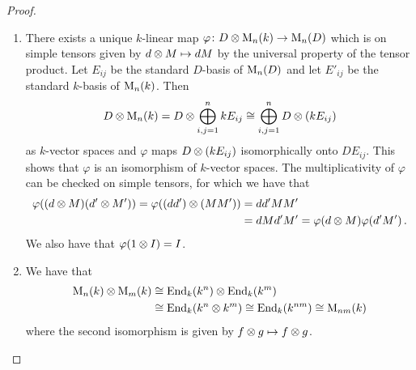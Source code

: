 \begin{proof}
  \leavevmode
  \begin{enumerate}
    \item
      There exists a unique $k$-linear map $\varphi \colon D \mathbin{\otimes} \operatorname{M}_n(k) \to \operatorname{M}_n(D)$ which is on simple tensors given by $d \mathbin{\otimes} M \mapsto dM$ by the universal property of the tensor product.
      Let $E_{ij}$ be the standard $D$-basis of $\operatorname{M}_n(D)$ and let $E'_{ij}$ be the standard $k$-basis of $\operatorname{M}_n(k)$.
      Then
      \[
              D \mathbin{\otimes} \operatorname{M}_n(k)
        =     D \mathbin{\otimes} \bigoplus_{i,j=1}^n k E_{ij}
        \cong \bigoplus_{i,j=1}^n D \mathbin{\otimes} (k E_{ij})
      \]
      as $k$-vector spaces and $\varphi$ maps $D \mathbin{\otimes} (k E_{ij})$ isomorphically onto $D E_{ij}$.
      This shows that $\varphi$ is an isomorphism of $k$-vector spaces.
      The multiplicativity of $\varphi$ can be checked on simple tensors, for which we have that 
      \begin{align*}
            \varphi( (d \mathbin{\otimes} M) (d' \mathbin{\otimes} M') )
         =  \varphi( (d d') \mathbin{\otimes} (M M') )
        &=  d d' M M' \\
        &=  d M d' M'
         =  \varphi(d \mathbin{\otimes} M) \varphi(d' M') \,.
      \end{align*}
      We also have that $\varphi(1 \mathbin{\otimes} I) = I$.
    \item
      We have that
      \begin{align*}
                \operatorname{M}_n(k) \mathbin{\otimes} \operatorname{M}_m(k)
        &\cong  \operatorname{End}_k(k^n) \mathbin{\otimes} \operatorname{End}_k(k^m) \\
        &\cong  \operatorname{End}_k(k^n \mathbin{\otimes} k^m)
         \cong \operatorname{End}_k(k^{nm})
         \cong \operatorname{M}_{nm}(k)
      \end{align*}
      where the second isomorphism is given by $f \mathbin{\otimes} g \mapsto f \mathbin{\otimes} g$.
    \qedhere
  \end{enumerate}
\end{proof}


